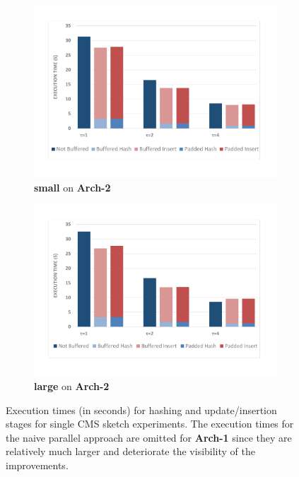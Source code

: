 \documentclass[10pt, conference, compsocconf]{IEEEtran}
\begin{document}
\begin{figure}[htbp]
\begin{subfigure}[t]{0.47\textwidth}
\includegraphics[width=\linewidth]{expfigs/8x211rasbpi.pdf}
\caption{{\bf small} on {\bf Arch-2}}
\label{fig:8x211arch2}
\end{subfigure}
\begin{subfigure}[t]{0.47\textwidth}\hspace*{2ex}
\includegraphics[width=\linewidth]{expfigs/8x2003rasbpi.pdf}
\caption{{\bf large} on {\bf Arch-2}}
\label{fig:8x2003arch2}
\end{subfigure}

\caption{Execution times (in seconds) for hashing and update/insertion stages for single CMS sketch experiments. The execution times for the naive parallel approach are omitted for {\bf Arch-1} since they are relatively much larger and deteriorate the visibility of the improvements.}
\label{fig:sum}
\end{figure}
\end{document}
